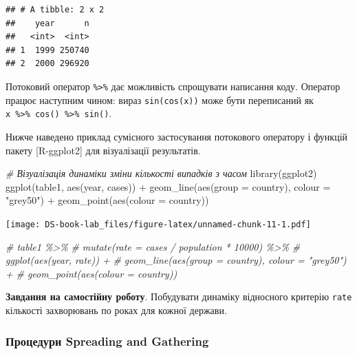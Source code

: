\documentclass[
]{book}
\newenvironment{Shaded}{\begin{snugshade}}{\end{snugshade}}
\newcommand{\AttributeTok}[1]{\textcolor[rgb]{0.77,0.63,0.00}{#1}}
\newcommand{\CommentTok}[1]{\textcolor[rgb]{0.56,0.35,0.01}{\textit{#1}}}
\newcommand{\FunctionTok}[1]{\textcolor[rgb]{0.00,0.00,0.00}{#1}}
\newcommand{\NormalTok}[1]{#1}
\newcommand{\SpecialCharTok}[1]{\textcolor[rgb]{0.00,0.00,0.00}{#1}}
\newcommand{\StringTok}[1]{\textcolor[rgb]{0.31,0.60,0.02}{#1}}
\begin{document}
\begin{verbatim}
## # A tibble: 2 x 2
##    year      n
##   <int>  <int>
## 1  1999 250740
## 2  2000 296920
\end{verbatim}

Потоковий оператор \texttt{\%\textgreater{}\%} дає можливість спрощувати написання коду. Оператор працює наступним чином: вираз \texttt{sin(cos(x))} може бути переписаний як \texttt{x\ \%\textgreater{}\%\ cos()\ \%\textgreater{}\%\ sin()}.

Нижче наведено приклад сумісного застосування потокового оператору і функцій пакету {[}R-ggplot2{]} для візуалізації результатів.

\begin{Shaded}
\begin{Highlighting}[]
\CommentTok{\# Візуалізація динаміки зміни кількості випадків з часом}
\FunctionTok{library}\NormalTok{(ggplot2)}
\FunctionTok{ggplot}\NormalTok{(table1, }\FunctionTok{aes}\NormalTok{(year, cases)) }\SpecialCharTok{+} 
  \FunctionTok{geom\_line}\NormalTok{(}\FunctionTok{aes}\NormalTok{(}\AttributeTok{group =}\NormalTok{ country), }\AttributeTok{colour =} \StringTok{"grey50"}\NormalTok{) }\SpecialCharTok{+} 
  \FunctionTok{geom\_point}\NormalTok{(}\FunctionTok{aes}\NormalTok{(}\AttributeTok{colour =}\NormalTok{ country))}
\end{Highlighting}
\end{Shaded}

\texttt{[image: DS-book-lab\_files/figure-latex/unnamed-chunk-11-1.pdf]}

\begin{Shaded}
\begin{Highlighting}[]
\CommentTok{\# table1 \%\textgreater{}\% }
\CommentTok{\#   mutate(rate = cases / population * 10000) \%\textgreater{}\% }
\CommentTok{\#   ggplot(aes(year, rate)) + }
\CommentTok{\#   geom\_line(aes(group = country), colour = "grey50") + }
\CommentTok{\#   geom\_point(aes(colour = country))}
\end{Highlighting}
\end{Shaded}

\textbf{Завдання на самостійну роботу}. Побудувати динаміку відносного критерію \texttt{rate} кількості захворювань по роках для кожної держави.

\hypertarget{ux43fux440ux43eux446ux435ux434ux443ux440ux438-spreading-and-gathering}{%
\subsubsection{Процедури Spreading and Gathering}\label{ux43fux440ux43eux446ux435ux434ux443ux440ux438-spreading-and-gathering}}
\end{document}
